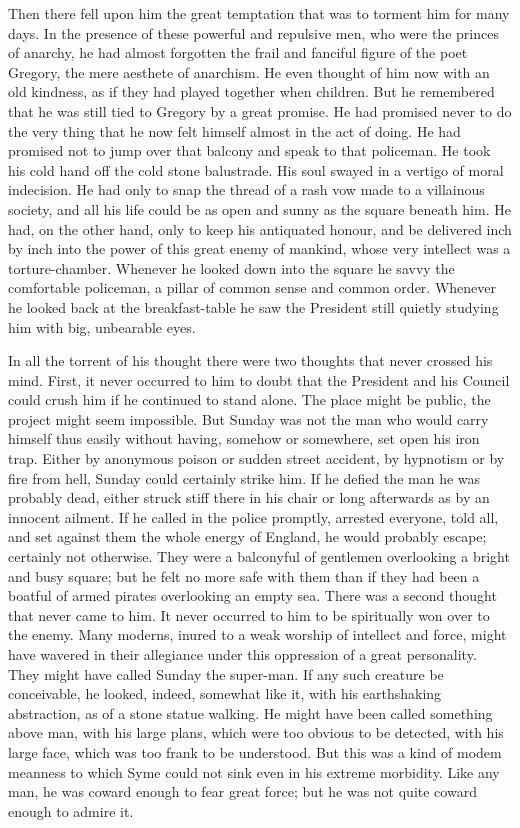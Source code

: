 \documentclass{book}
\begin{document}
Then there fell upon him the great temptation that was to torment him for many days. In the presence of these powerful and repulsive men, who were the princes of anarchy, he had almost forgotten the frail and fanciful figure of the poet Gregory, the mere aesthete of anarchism. He even thought of him now with an old kindness, as if they had played together when children. But he remembered that he was still tied to Gregory by a great promise. He had promised never to do the very thing that he now felt himself almost in the act of doing. He had promised not to jump over that balcony and speak to that policeman. He took his cold hand off the cold stone balustrade. His soul swayed in a vertigo of moral indecision. He had only to snap the thread of a rash vow made to a villainous society, and all his life could be as open and sunny as the square beneath him. He had, on the other hand, only to keep his antiquated honour, and be delivered inch by inch into the power of this great enemy of mankind, whose very intellect was a torture-chamber. Whenever he looked down into the square he savvy the comfortable policeman, a pillar of common sense and common order. Whenever he looked back at the breakfast-table he saw the President still quietly studying him with big, unbearable eyes.

In all the torrent of his thought there were two thoughts that never crossed his mind. First, it never occurred to him to doubt that the President and his Council could crush him if he continued to stand alone. The place might be public, the project might seem impossible. But Sunday was not the man who would carry himself thus easily without having, somehow or somewhere, set open his iron trap. Either by anonymous poison or sudden street accident, by hypnotism or by fire from hell, Sunday could certainly strike him. If he defied the man he was probably dead, either struck stiff there in his chair or long afterwards as by an innocent ailment. If he called in the police promptly, arrested everyone, told all, and set against them the whole energy of England, he would probably escape; certainly not otherwise. They were a balconyful of gentlemen overlooking a bright and busy square; but he felt no more safe with them than if they had been a boatful of armed pirates overlooking an empty sea. There was a second thought that never came to him. It never occurred to him to be spiritually won over to the enemy. Many moderns, inured to a weak worship of intellect and force, might have wavered in their allegiance under this oppression of a great personality. They might have called Sunday the super-man. If any such creature be conceivable, he looked, indeed, somewhat like it, with his earthshaking abstraction, as of a stone statue walking. He might have been called something above man, with his large plans, which were too obvious to be detected, with his large face, which was too frank to be understood. But this was a kind of modem meanness to which Syme could not sink even in his extreme morbidity. Like any man, he was coward enough to fear great force; but he was not quite coward enough to admire it.
\end{document}
